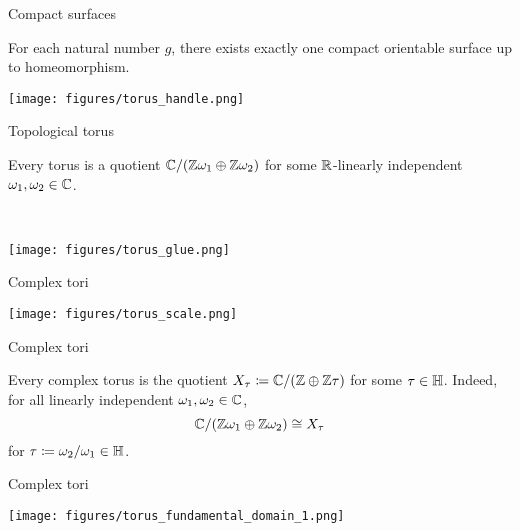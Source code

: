 \documentclass{beamer}
\begin{document}
    \begin{frame}{Compact surfaces}
        \begin{theorem}
            For each natural number $g$, there exists exactly one compact orientable surface up to homeomorphism.
        \end{theorem}

        \pause

        \begin{center}
            \texttt{[image: figures/torus\_handle.png]}
        \end{center}
    \end{frame}
    \begin{frame}{Topological torus}
        \begin{theorem}
            Every torus is a quotient $\mathbb{C}/\!\left(\mathbb{Z}\omega_1\oplus\mathbb{Z}\omega_2\right)$ for some $\mathbb{R}$-linearly independent $\omega_1,\omega_2\in\mathbb{C}$.
        \end{theorem}

        \pause\ \\

        \begin{center}
            \texttt{[image: figures/torus\_glue.png]}
        \end{center}
    \end{frame}
    \begin{frame}{Complex tori}
        \begin{center}
            \texttt{[image: figures/torus\_scale.png]}
        \end{center}
    \end{frame}
    \begin{frame}{Complex tori}
        \begin{theorem}
            Every complex torus is the quotient $X_\tau\coloneqq\mathbb{C}/\!\left(\mathbb{Z}\oplus\mathbb{Z}\tau\right)$ for some $\tau\in\mathbb{H}$. Indeed, for all linearly independent $\omega_1,\omega_2\in\mathbb{C}$,
            \begin{equation*}
                \mathbb{C}/\!\left(\mathbb{Z}\omega_1\oplus\mathbb{Z}\omega_2\right)\cong X_\tau
            \end{equation*}
            for $\tau\coloneqq\omega_2/\omega_1\in\mathbb{H}$.
        \end{theorem}
    \end{frame}
    \begin{frame}{Complex tori}
        \begin{center}
            \texttt{[image: figures/torus\_fundamental\_domain\_1.png]}
        \end{center}
    \end{frame}
\end{document}
